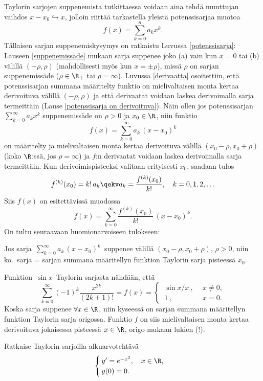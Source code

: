 Taylorin sarjojen suppenemista tutkittaessa voidaan aina tehdä muuttujan vaihdos 
$x-x_0\hookrightarrow x$, jolloin riittää tarkastella yleistä potenssisarjaa muotoa
\[ 
f(x) = \sum_{k=0}^n a_k x^k. 
\]
Tällaisen sarjan suppenemiskysymys on ratkaistu Luvussa \ref{potenssisarja}: Lauseen 
\ref{suppenemissäde} mukaan sarja suppenee joko (a) vain kun $x=0$ tai (b) välillä 
$(-\rho,\rho)$ (mahdollisesti myös kun $x = \pm \rho$), missä $\rho$ on sarjan suppenemissäde
($\rho \in \R_+$ tai $\rho = \infty$). Luvussa \ref{derivaatta} osoitettiin, että 
potenssisarjan summana määritelty funktio on mielivaltaisen monta kertaa derivoituva välillä 
$(-\rho,\rho)$ ja että derivaatat voidaan laskea derivoimalla sarja termeittäin
(Lause \ref{potenssisarja on derivoituva}). Näin ollen jos potenssisarjan
$\sum_{k=0}^\infty a_k x^k$ suppenemissäde on $\rho>0$ ja $x_0 \in \R$, niin funktio
\[ 
f(x) = \sum_{k=0}^\infty a_k\,(x-x_0)^k 
\]
on määritelty ja mielivaltaisen monta kertaa derivoituva välillä $(x_0-\rho,x_0+\rho)$ 
(koko $\R$:ssä, jos $\rho=\infty$) ja $f$:n derivaatat voidaan laskea derivoimalla sarja 
termeittäin. Kun derivoimispisteeksi valitaan erityisesti $x_0$, saadaan tulos
\[
f^{(k)}(x_0) = k!\,a_k \qekv a_k = \frac{f^{(k)}(x_0)}{k!}, \quad k = 0,1,2, \ldots 
\]
Siis $f(x)$ on esitettävissä muodossa
\[
f(x) = \sum_{k=0}^\infty \frac{f^{(k)}(x_0)}{k!}\,(x-x_0)^k.
\]
On tultu seuraavaan huomionarvoiseen tulokseen:
\begin{Lause} Jos sarja $\,\sum_{k=0}^\infty a_k\,(x-x_0)^k\,$ suppenee välillä 
$(x_0-\rho,x_0+\rho)$, $\rho>0$, niin ko.\ sarja = sarjan summana määritellyn funktion
Taylorin sarja pisteessä $x_0$.
\end{Lause}
\begin{Exa} \label{sinx/x}
Funktion $\,\sin x\,$ Taylorin sarjasta nähdään, että
\[
\sum_{k=0}^\infty (-1)^k\frac{x^{2k}}{(2k+1)!} = f(x) = \begin{cases}
                                                        \ \sin x/x\ , \ \ &x\neq 0, \\
                                                        \ 1\ ,            &x=0.
                                                        \end{cases}
\]
Koska sarja suppenee $\forall x\in\R$, niin kyseessä on sarjan summana määritellyn funktion 
Taylorin sarja origossa. Funktio $f$ on siis mielivaltaisen monta kertaa derivoituva
jokaisessa pisteessä $x\in\R$, origo mukaan lukien (!). \loppu
\end{Exa}
\begin{Exa} Ratkaise Taylorin sarjoilla alkuarvotehtävä
\[ \begin{cases} 
    \,y' = e^{-x^2}, \quad x \in \R, \\
    \,y(0) = 0.
\end{cases} \]
\end{Exa}
